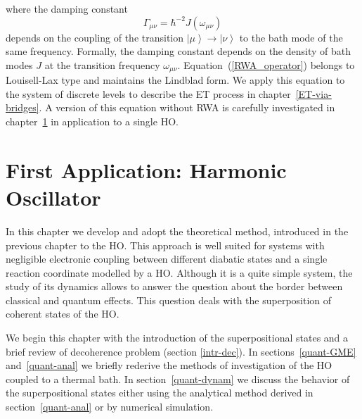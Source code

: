 \documentclass[12pt,twoside,a4paper]{report}
\begin{document}
where the damping constant
\begin{equation}
\label{g=kv-ohne-v}
\Gamma
_{\mu \nu}
           =
              \hbar^{-2}
              J(\omega_{\mu \nu}) 
\end{equation}
depends on the coupling of the transition 
$\left| \mu \right>\to\left| \nu \right>$ 
to the bath mode of the same frequency.  Formally, the damping constant
depends on the density of bath modes $J$ at the transition frequency
$\omega_{\mu \nu}$.
Equation~(\ref{RWA_operator}) belongs to Louisell-Lax type and maintains the Lindblad form.
We apply this equation to the system of discrete levels 
to describe the ET process 
in chapter~\ref{ET-via-bridges}.
A version of this equation without RWA is carefully investigated 
in chapter~\ref{first-application:HO} in application to 
a single HO.







\chapter{First Application: Harmonic Oscillator} \label{first-application:HO} 
%

\label{quant-introduction}
In this chapter we develop and adopt the theoretical method, 
introduced in the previous chapter to the HO. 
This approach is well suited for systems 
with negligible electronic coupling between
different diabatic states
and a single reaction coordinate modelled by a HO.
Although it is a quite simple system,
the study of its dynamics allows to answer 
the
question about the border 
between classical and quantum effects. 
This question deals with the 
superposition of coherent states of the HO.

We begin this chapter with the 
introduction
of the superpositional states
and a brief review of decoherence problem (section \ref{intr-dec}).
In sections~\ref{quant-GME} and~\ref{quant-anal}
 we briefly rederive the methods of
investigation of the HO coupled to a thermal bath. 
In section~\ref{quant-dynam} we discuss 
the behavior of the
superpositional states either using the analytical method derived 
in section~\ref{quant-anal}
or by numerical simulation.
\end{document}
